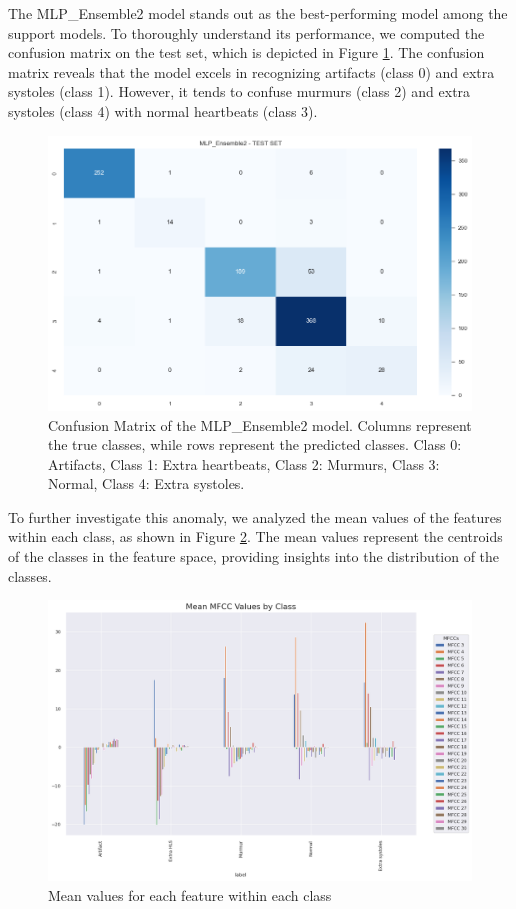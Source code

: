 The MLP\_Ensemble2 model stands out as the best-performing model among the support models.
To thoroughly understand its performance, we computed the confusion matrix on the test set, which is depicted in Figure \ref{fig:support_models_conf_matrix}.
The confusion matrix reveals that the model excels in recognizing artifacts (class 0) and extra systoles (class 1).
However, it tends to confuse murmurs (class 2) and extra systoles (class 4) with normal heartbeats (class 3).
\begin{figure}[h]
    \centering
    \includegraphics[width=\columnwidth]{../images/support_models_conf_matrix.png}
    \caption{Confusion Matrix of the MLP\_Ensemble2 model. Columns represent the true classes, while rows represent the predicted classes. Class 0: Artifacts, Class 1: Extra heartbeats, Class 2: Murmurs, Class 3: Normal, Class 4: Extra systoles.}
    \label{fig:support_models_conf_matrix}
\end{figure}
\noindent
To further investigate this anomaly, we analyzed the mean values of the features within each class, as shown in Figure \ref{fig:mean_val_for_features}.
The mean values represent the centroids of the classes in the feature space, providing insights into the distribution of the classes.
\begin{figure}[h]
    \centering
    \includegraphics[width=\columnwidth]{../images/mean_val_for_features.png}
    \caption{Mean values for each feature within each class}
    \label{fig:mean_val_for_features}
\end{figure}

